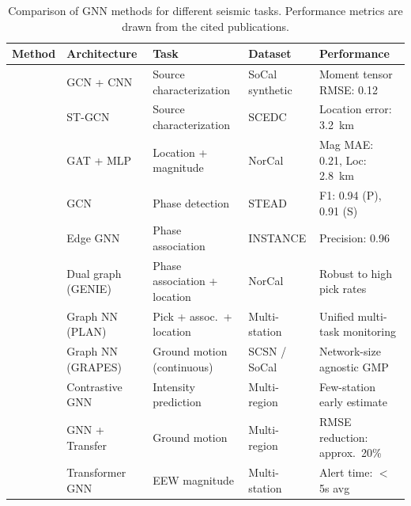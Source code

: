 \documentclass[review,authoryear]{elsarticle}
\begin{document}
\begin{table}[htbp]
\centering
\caption{Comparison of GNN methods for different seismic tasks. Performance metrics are drawn from the cited publications.}
\label{tab:gnn_comparison}
\small
\begin{tabular}{p{2.5cm}p{2.5cm}p{2.5cm}p{2cm}p{2.5cm}}
\toprule
\textbf{Method} & \textbf{Architecture} & \textbf{Task} & \textbf{Dataset} & \textbf{Performance} \\
\midrule
\citet{vandenende2020automated} & GCN + CNN & Source characterization & SoCal synthetic & Moment tensor RMSE: 0.12 \\
\citet{zhang2021spatiotemporal} & ST-GCN & Source characterization & SCEDC & Location error: 3.2~km \\
\citet{mcbrearty2023earthquake} & GAT + MLP & Location + magnitude & NorCal & Mag MAE: 0.21, Loc: 2.8~km \\
\citet{bilal2022graph} & GCN & Phase detection & STEAD & F1: 0.94 (P), 0.91 (S) \\
\citet{munchmeyer2021gnn} & Edge GNN & Phase association & INSTANCE & Precision: 0.96 \\
\citet{mcbrearty2023genie} & Dual graph (GENIE) & Phase association + location & NorCal & Robust to high pick rates \\
\citet{si2024plan} & Graph NN (PLAN) & Pick + assoc.\ + location & Multi-station & Unified multi-task monitoring \\
\citet{clements2024grapes} & Graph NN (GRAPES) & Ground motion (continuous) & SCSN / SoCal & Network-size agnostic GMP \\
\citet{murshed2024scgnn} & Contrastive GNN & Intensity prediction & Multi-region & Few-station early estimate \\
\citet{jozinovic2022transfer} & GNN + Transfer & Ground motion & Multi-region & RMSE reduction: approx.\ 20\% \\
\citet{munchmeyer2022team} & Transformer GNN & EEW magnitude & Multi-station & Alert time: $<$5s avg \\
\bottomrule
\end{tabular}
\end{table}
\end{document}
